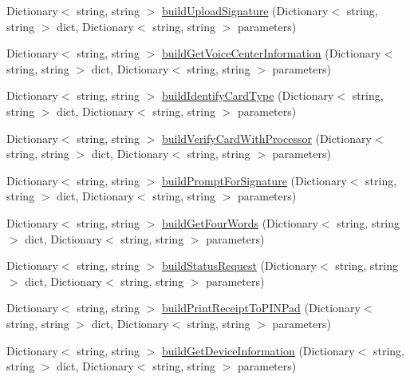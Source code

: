 \begin{DoxyCompactItemize}
\item 
Dictionary$<$ string, string $>$ \mbox{\hyperlink{class_form_sim_1_1_h_t_t_p_handler_a37b770bc060a902e4fe149731b04ce48}{build\+Upload\+Signature}} (Dictionary$<$ string, string $>$ dict, Dictionary$<$ string, string $>$ parameters)
\item 
Dictionary$<$ string, string $>$ \mbox{\hyperlink{class_form_sim_1_1_h_t_t_p_handler_af9078923d0db307f20ac054594cbcaee}{build\+Get\+Voice\+Center\+Information}} (Dictionary$<$ string, string $>$ dict, Dictionary$<$ string, string $>$ parameters)
\item 
Dictionary$<$ string, string $>$ \mbox{\hyperlink{class_form_sim_1_1_h_t_t_p_handler_a18341e43f3157b786d314d71f402767c}{build\+Identify\+Card\+Type}} (Dictionary$<$ string, string $>$ dict, Dictionary$<$ string, string $>$ parameters)
\item 
Dictionary$<$ string, string $>$ \mbox{\hyperlink{class_form_sim_1_1_h_t_t_p_handler_a3123725d76b87880efbaa48e83395e3d}{build\+Verify\+Card\+With\+Processor}} (Dictionary$<$ string, string $>$ dict, Dictionary$<$ string, string $>$ parameters)
\item 
Dictionary$<$ string, string $>$ \mbox{\hyperlink{class_form_sim_1_1_h_t_t_p_handler_aad07a15901dadcdaa347e2f7a374adeb}{build\+Prompt\+For\+Signature}} (Dictionary$<$ string, string $>$ dict, Dictionary$<$ string, string $>$ parameters)
\item 
Dictionary$<$ string, string $>$ \mbox{\hyperlink{class_form_sim_1_1_h_t_t_p_handler_a2530058a140656b8ca6648cf59dfb559}{build\+Get\+Four\+Words}} (Dictionary$<$ string, string $>$ dict, Dictionary$<$ string, string $>$ parameters)
\item 
Dictionary$<$ string, string $>$ \mbox{\hyperlink{class_form_sim_1_1_h_t_t_p_handler_a55e9535d4f93c663b081064b2935104e}{build\+Status\+Request}} (Dictionary$<$ string, string $>$ dict, Dictionary$<$ string, string $>$ parameters)
\item 
Dictionary$<$ string, string $>$ \mbox{\hyperlink{class_form_sim_1_1_h_t_t_p_handler_ab53093caf6299e315441805ae43eb57f}{build\+Print\+Receipt\+To\+P\+I\+N\+Pad}} (Dictionary$<$ string, string $>$ dict, Dictionary$<$ string, string $>$ parameters)
\item 
Dictionary$<$ string, string $>$ \mbox{\hyperlink{class_form_sim_1_1_h_t_t_p_handler_a867f024e3e119d6601814e41a63ce2d5}{build\+Get\+Device\+Information}} (Dictionary$<$ string, string $>$ dict, Dictionary$<$ string, string $>$ parameters)
\item 

\end{DoxyCompactItemize}
